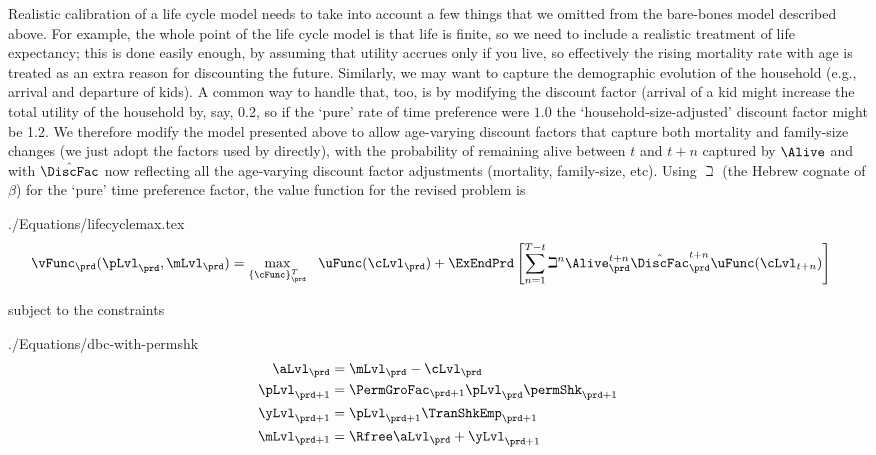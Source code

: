 \documentclass[\econtexRoot/SolvingMicroDSOPs]{subfiles}
\begin{document}
Realistic calibration of a life cycle model needs to take into account a few things that we omitted from the bare-bones model described above. For example, the whole point of the life cycle model is that life is finite, so we need to include a realistic treatment of life expectancy; this is done easily enough, by assuming that utility accrues only if you live, so effectively the rising mortality rate with age is treated as an extra reason for discounting the future.  Similarly, we may want to capture the demographic evolution of the household (e.g., arrival and departure of kids).  A common way to handle that, too, is by modifying the discount factor (arrival of a kid might increase the total utility of the household by, say, 0.2, so if the `pure' rate of time preference were $1.0$ the `household-size-adjusted' discount factor might be 1.2.  We therefore modify the model presented above to allow age-varying discount factors that capture both mortality and family-size changes (we just adopt the factors used by \cite{cagettiWprofiles} directly), with the probability of remaining alive between $t$ and $t+n$ captured by $\Alive$ and with $\hat{\DiscFac}$ now reflecting all the age-varying discount factor adjustments (mortality, family-size, etc).  Using $\beth$ (the Hebrew cognate of $\beta$) for the `pure' time preference factor, the value function for the revised problem is
\begin{verbatimwrite}{./Equations/lifecyclemax.tex}
  \begin{equation}\begin{gathered}\begin{aligned}
        \vFunc_{\prd}(\pLvl_{\prd},\mLvl_{\prd}) & =    \max_{\{\cFunc\}_{\prd}^{T}}~~ \uFunc(\cLvl_{\prd})+\ExEndPrd\left[\sum_{n=1}^{T-t}\beth^{n} \Alive_{\prd}^{t+n}\hat{\DiscFac}_{\prd}^{t+n} \uFunc(\cLvl_{t+n}) \right]   \label{eq:lifecyclemax}
      \end{aligned}\end{gathered}  \end{equation}
\end{verbatimwrite}
\unskip
subject to the constraints
\begin{verbatimwrite}{./Equations/dbc-with-permshk}
  \begin{equation*}\begin{gathered}\begin{aligned}
        \aLvl_{\prd}  & = \mLvl_{\prd}-\cLvl_{\prd}
        \\      \pLvl_{\prd+1}  & = \PermGroFac_{\prd+1}\pLvl_{\prd}\permShk_{\prd+1}
        \\      \yLvl_{\prd+1}  & = \pLvl_{\prd+1}\TranShkEmp _{\prd+1}
        \\      \mLvl_{\prd+1}  & = \Rfree \aLvl_{\prd}+\yLvl_{\prd+1}
      \end{aligned}\end{gathered}\end{equation*}
\end{verbatimwrite} 
\end{document}
